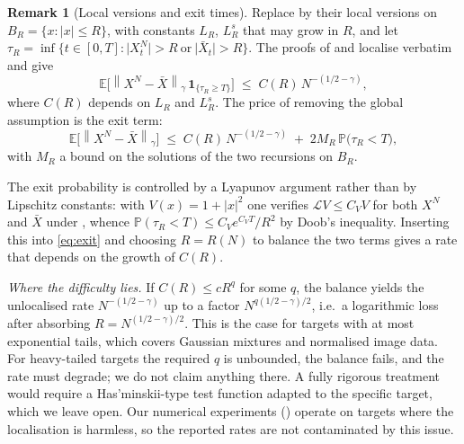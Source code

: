 \documentclass[a4paper,fleqn]{cas-dc}
\theoremstyle{definition}
\newtheorem{remark}[theorem]{Remark}
\newcommand{\E}{\mathbb{E}}
\newcommand{\PP}{\mathbb{P}}
\newcommand{\norm}[1]{\left\lVert#1\right\rVert}
\newcommand{\holder}[1]{\norm{#1}_{\gamma}}
\begin{document}
\begin{remark}[Local versions and exit times]
\label{rem:local}
Replace  by their local versions on
$B_{R}=\{x:\lvert x\rvert\le R\}$, with constants $L_{R}$, $L^{s}_{R}$ that may
grow in $R$, and let
$\tau_{R}=\inf\{t\in[0,T]:\lvert X^{N}_{t}\rvert>R\ \text{or}\ \lvert\bar
X_{t}\rvert>R\}$. The proofs of  and 
localise verbatim and give
\begin{equation}
\E\bigl[\holder{X^{N}-\bar X}\,\mathbf{1}_{\{\tau_{R}\ge T\}}\bigr]
\;\le\; C(R)\,N^{-(1/2-\gamma)},
\label{eq:localised}
\end{equation}
where $C(R)$ depends on $L_{R}$ and $L^{s}_{R}$. The price of removing the
global assumption is the exit term:
\begin{equation}
\E\bigl[\holder{X^{N}-\bar X}\bigr]
\;\le\; C(R)\,N^{-(1/2-\gamma)}
\;+\; 2M_{R}\,\PP\bigl(\tau_{R}<T\bigr),
\label{eq:exit}
\end{equation}
with $M_{R}$ a bound on the solutions of the two recursions on $B_{R}$.
\end{remark}

The exit probability is controlled by a Lyapunov argument rather than by
Lipschitz constants: with $V(x)=1+\lvert x\rvert^{2}$ one verifies
$\mathcal{L}V\le C_{V}V$ for both $X^{N}$ and $\bar X$ under
, whence
$\PP(\tau_{R}<T)\le C_{V}e^{C_{V}T}/R^{2}$ by Doob's inequality. Inserting this
into \eqref{eq:exit} and choosing $R=R(N)$ to balance the two terms gives a
rate that depends on the growth of $C(R)$.

\emph{Where the difficulty lies.} If $C(R)\le cR^{q}$ for some $q$, the
balance yields the unlocalised rate $N^{-(1/2-\gamma)}$ up to a factor
$N^{q(1/2-\gamma)/2}$, i.e.\ a logarithmic loss after absorbing
$R=N^{(1/2-\gamma)/2}$. This is the case for targets with at most exponential
tails, which covers Gaussian mixtures and normalised image data. For
heavy-tailed targets the required $q$ is unbounded, the balance fails, and the
rate must degrade; we do not claim anything there. A fully rigorous treatment
would require a Has'minskii-type test function adapted to the specific target,
which we leave open. Our numerical experiments () operate on
targets where the localisation is harmless, so the reported rates are not
contaminated by this issue.
\end{document}
